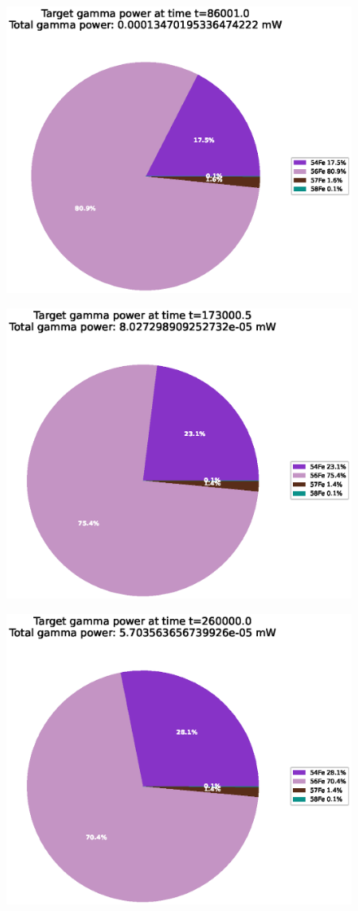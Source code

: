 \begin{figure}[!htb]
\centering
\includegraphics[width=0.8\linewidth]{chapters/results_activity_code/fe-activity-v2/target-energy/0166_86001.eps}
\caption{}
\label{fig:activity-v2-target-power-86001s}
\end{figure}

\begin{figure}[!htb]
\centering
\includegraphics[width=0.8\linewidth]{chapters/results_activity_code/fe-activity-v2/target-energy/0233_173000.eps}
\caption{}
\label{fig:activity-v2-target-power-173000s}
\end{figure}

\begin{figure}[!htb]
\centering
\includegraphics[width=0.8\linewidth]{chapters/results_activity_code/fe-activity-v2/target-energy/0300_260000.eps}
\caption{}
\label{fig:activity-v2-target-power-260000s}
\end{figure}


